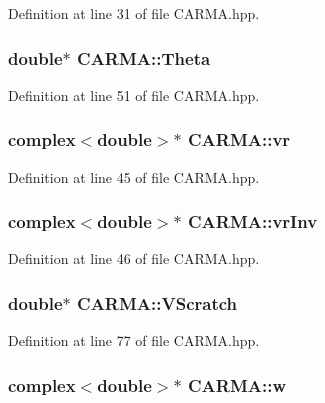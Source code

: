 Definition at line 31 of file C\-A\-R\-M\-A.\-hpp.

\hypertarget{class_c_a_r_m_a_a5717e11c4a42a0d3c932a69e6493d22b}{
\subsubsection[{Theta}]{\setlength{\rightskip}{0pt plus 5cm}double$\ast$ C\-A\-R\-M\-A\-::\-Theta}}\label{class_c_a_r_m_a_a5717e11c4a42a0d3c932a69e6493d22b}


Definition at line 51 of file C\-A\-R\-M\-A.\-hpp.

\hypertarget{class_c_a_r_m_a_a7ef9e8afd4bd3adcf2931bad09c831af}{
\subsubsection[{vr}]{\setlength{\rightskip}{0pt plus 5cm}complex$<$double$>$$\ast$ C\-A\-R\-M\-A\-::vr}}\label{class_c_a_r_m_a_a7ef9e8afd4bd3adcf2931bad09c831af}


Definition at line 45 of file C\-A\-R\-M\-A.\-hpp.

\hypertarget{class_c_a_r_m_a_a1128984d1bb62a18c9046730fdc9b234}{
\subsubsection[{vr\-Inv}]{\setlength{\rightskip}{0pt plus 5cm}complex$<$double$>$$\ast$ C\-A\-R\-M\-A\-::vr\-Inv}}\label{class_c_a_r_m_a_a1128984d1bb62a18c9046730fdc9b234}


Definition at line 46 of file C\-A\-R\-M\-A.\-hpp.

\hypertarget{class_c_a_r_m_a_ad9d4a76333d0b578ce167d43801f9347}{
\subsubsection[{V\-Scratch}]{\setlength{\rightskip}{0pt plus 5cm}double$\ast$ C\-A\-R\-M\-A\-::\-V\-Scratch}}\label{class_c_a_r_m_a_ad9d4a76333d0b578ce167d43801f9347}


Definition at line 77 of file C\-A\-R\-M\-A.\-hpp.

\hypertarget{class_c_a_r_m_a_a34484d60e14f53e2e2bb378a4e9e7344}{
\subsubsection[{w}]{\setlength{\rightskip}{0pt plus 5cm}complex$<$double$>$$\ast$ C\-A\-R\-M\-A\-::w}}\label{class_c_a_r_m_a_a34484d60e14f53e2e2bb378a4e9e7344}



